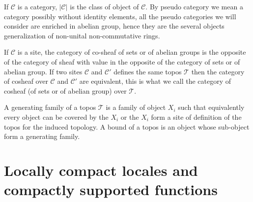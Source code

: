 \documentclass[a4paper]{article}
\newcommand{\Tcal}{\mathcal{T}}
\newcommand{\Ccal}{\mathcal{C}}
\newcommand{\blockn}[1]{\par #1 \bigskip}
\begin{document}
\blockn{If $\Ccal$ is a category, $|\Ccal|$ is the class of object of $\Ccal$. By pseudo category we mean a category possibly without identity elements, all the pseudo categories we will consider are enriched in abelian group, hence they are the several objects generalization of non-unital non-commutative rings.  }

\blockn{If $\Ccal$ is a site, the category of co-sheaf of sets or of abelian groups is the opposite of the category of sheaf with value in the opposite of the category of sets or of abelian group. If two sites $\Ccal$ and $\Ccal'$ defines the same topos $\Tcal$ then the category of cosheaf over $\Ccal$ and $\Ccal'$ are equivalent, this is what we call the category of cosheaf (of sets or of abelian group) over $\Tcal$.  }

\blockn{A generating family of a topos $\Tcal$ is a family of object $X_i$ such that equivalently every object can be covered by the $X_i$ or the $X_i$ form a site of definition of the topos for the induced topology. A bound of a topos is an object whose sub-object form a generating family.}

\section{Locally compact locales and compactly supported functions}

\label{Sec_localcompactness}
\end{document}

